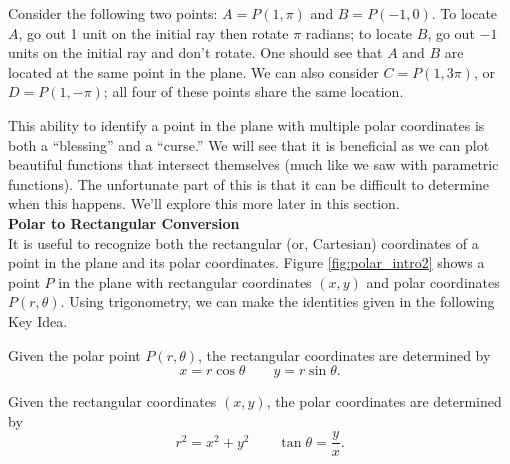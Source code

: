 Consider the following two points: $A = P(1,\pi)$ and $B = P(-1,0)$. To locate $A$, go out 1 unit on the initial ray then rotate $\pi$ radians; to locate $B$, go out $-1$ units on the initial ray and don't rotate. One should see that $A$ and $B$ are located at the same point in the plane. We can also consider $C=P(1,3\pi)$, or $D = P(1,-\pi)$; all four of these points share the same location. 

This ability to identify a point in the plane with multiple polar coordinates is both a ``blessing'' and a ``curse.'' We will see that it is beneficial as we can plot beautiful functions that intersect themselves (much like we saw with parametric functions). The unfortunate part of this is that it can be difficult to determine when this happens. We'll explore this more later in this section.\\

\noindent\textbf{\large Polar to Rectangular Conversion}\\

It is useful to recognize both the rectangular (or, Cartesian) coordinates of a point in the plane and its polar coordinates. Figure \ref{fig:polar_intro2} shows a point $P$ in the plane with rectangular coordinates $(x,y)$ and polar coordinates $P(r,\theta)$. Using trigonometry, we can make the identities given in the following Key Idea.

{Given the polar point $P(r,\theta)$, the rectangular coordinates are determined by $$x=r\cos \theta\qquad y=r\sin \theta.$$

Given the rectangular coordinates $(x,y)$, the polar coordinates are determined by
$$ r^2=x^2+y^2\qquad \tan \theta = \frac yx.$$
}

